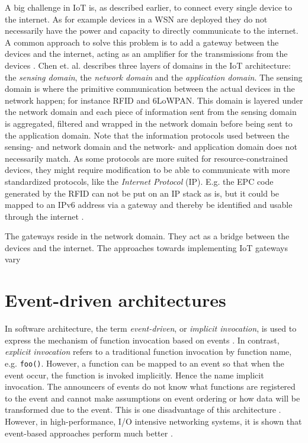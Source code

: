 A big challenge in IoT is, as described earlier, to connect every single device
to the internet. As for example devices in a WSN are deployed they do not
necessarily have the power and capacity to directly communicate to the
internet. A common approach to solve this problem is to add a gateway between
the devices and the internet, acting as an amplifier for the transmissions from
the devices \cite{zhu2010iot}. Chen et. al. \cite{chen2011brief} describes three
layers of domains in the IoT architecture: the \textit{sensing domain}, the
\textit{network domain} and the \textit{application domain}. The sensing domain
is where the primitive communication between the actual devices in the network
happen; for instance RFID and 6LoWPAN. This domain is layered under the network
domain and each piece of information sent from the sensing domain is
aggregated, filtered and wrapped in the network domain before being sent to the
application domain. Note that the information protocols used between the
sensing- and network domain and the network- and application domain does not
necessarily match. As some protocols are more suited for resource-constrained
devices, they might require modification to be able to communicate with more
standardized protocols, like the \textit{Internet Protocol} (IP). E.g. the EPC
code generated by the RFID can not be put on an IP stack as is, but it could be
mapped to an IPv6 address via a gateway and thereby be identified and usable
through the internet \cite{lee2007epc}.

The gateways reside in the network domain. They act as a bridge between the
devices and the internet. The approaches towards implementing IoT gateways vary


\section{Event-driven architectures}

In software architecture, the term \textit{event-driven}, or \textit{implicit
invocation}, is used to express the mechanism of function invocation based on
events \cite{garlan1993introduction}. In contrast, \textit{explicit invocation}
refers to a traditional function invocation by function name, e.g.
\lstinline{foo()}. However, a function can be mapped to an event
so that when the event occur, the function is invoked implicitly. Hence the
name implicit invocation. The announcers of events do not know what functions
are registered to the event and cannot make assumptions on event ordering or
how data will be transformed due to the event. This is one disadvantage of this
architecture \cite{garlan1993introduction}. However, in high-performance, I/O
intensive networking systems, it is shown that event-based approaches perform
much better \cite{hu1997measuring}.

